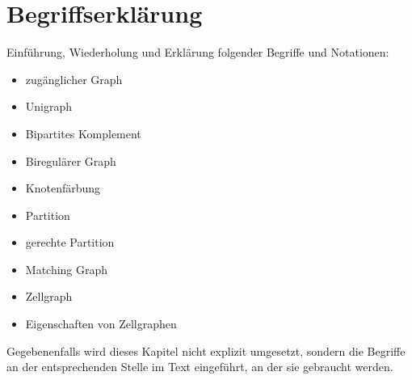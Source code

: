 \section{Begriffserklärung}
\label{sec/begriffe}

Einführung, Wiederholung und Erklärung folgender Begriffe und Notationen:
\begin{itemize}
	\item zugänglicher Graph
	\item Unigraph
	\item Bipartites Komplement
	\item Biregulärer Graph
	\item Knotenfärbung
	\item Partition
	\item gerechte Partition
	\item Matching Graph
	\item Zellgraph
	\item Eigenschaften von Zellgraphen
\end{itemize}

Gegebenenfalls wird dieses Kapitel nicht explizit umgesetzt, sondern die Begriffe an der entsprechenden Stelle im Text eingeführt, an der sie gebraucht werden.